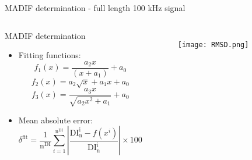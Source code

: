 \documentclass[10pt,aspectratio=169]{beamer} %
\begin{document}
\begin{frame}[label=frame21]{MADIF determination - full length 100 kHz signal}
		
		\begin{columns}[T]
			\begin{block}{MADIF determination}
				\begin{itemize}
					\item Fitting functions:\\
					\footnotesize
					\begin{equation*}
						f_1(x) = \frac{a_2x}{(x+a_1)}+a_0
						\label{eq:f1}
					\end{equation*}
					\begin{equation*}
						f_2(x) = a_2\sqrt{x}+a_1x +a_0
						\label{eq:f2}
					\end{equation*}
					\begin{equation*}
						f_3(x) = \frac{a_3x}{\sqrt{a_2x^2+a_1}}+a_0
						\label{eq:f3}
					\end{equation*}
				\end{itemize}
					\begin{itemize}
						\item Mean absolute error:\\
						\footnotesize
						\begin{equation*}
							\delta^{\mathrm{fit}} = \frac{1}{\mathrm{n^{DI}}}\sum_{i=1}^{\mathrm{n^{DI}}} \left|\frac{\mathrm{DI^i_{n}}-f(x^i)}{\mathrm{DI^i_{n}}}\right|\times100
							\label{eq:delta}
						\end{equation*}
					\end{itemize}
				\end{block}
				\begin{figure}
					\texttt{[image: RMSD.png]}
					\label{fig:RMSD_full_100}
				\end{figure}
			\end{columns}

\end{frame}
\end{document}
